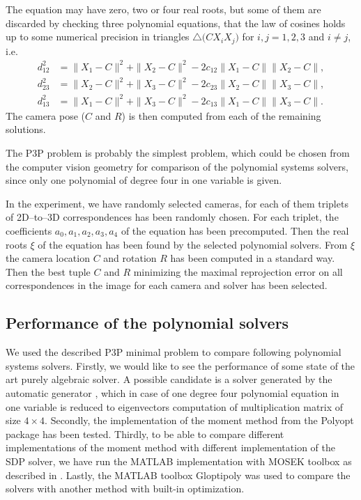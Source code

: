 The equation  may have zero, two or four real roots, but some of them are discarded by checking three polynomial equations, that the law of cosines holds up to some numerical precision in triangles $\triangle\big(CX_iX_j\big)$ for $i,j=1,2,3$ and $i\neq j$, i.e.
\begin{align}
  d_{12}^2 &= \|X_1-C\|^2 + \|X_2-C\|^2 - 2c_{12}\|X_1-C\|\|X_2-C\|,\\
  d_{23}^2 &= \|X_2-C\|^2 + \|X_3-C\|^2 - 2c_{23}\|X_2-C\|\|X_3-C\|,\\
  d_{13}^2 &= \|X_1-C\|^2 + \|X_3-C\|^2 - 2c_{13}\|X_1-C\|\|X_3-C\|.
\end{align}
The camera pose ($C$ and $R$) is then computed from each of the remaining solutions.

The P3P problem is probably the simplest problem, which could be chosen from the computer vision geometry for comparison of the polynomial systems solvers, since only one polynomial of degree four in one variable is given.


In the experiment, we have randomly selected \importAppPPPNumCameras{} cameras, for each of them \importAppPPPNumPoints{} triplets of 2D--to--3D correspondences has been randomly chosen.
For each triplet, the coefficients $a_0, a_1, a_2, a_3, a_4$ of the equation  has been precomputed.
Then the real roots $\xi$  of the equation  has been found by the selected polynomial solvers.
From $\xi$ the camera location $C$ and rotation $R$ has been computed in a standard way.
Then the best tuple $C$ and $R$ minimizing the maximal reprojection error on all correspondences in the image for each camera and solver has been selected.

\subsection{Performance of the polynomial solvers}
We used the described P3P minimal problem to compare following polynomial systems solvers.
Firstly, we would like to see the performance of some state of the art purely algebraic solver.
A possible candidate is a solver generated by the automatic generator \cite{autogen}, which in case of one degree four polynomial equation in one variable is reduced to eigenvectors computation of multiplication matrix of size $4\times4$.
Secondly, the implementation of the moment method from the Polyopt package has been tested.
Thirdly, to be able to compare different implementations of the moment method with different implementation of the SDP solver, we have run the MATLAB implementation with MOSEK toolbox as described in .
Lastly, the MATLAB toolbox Gloptipoly \cite{gloptipoly} was used to compare the solvers with another method with built-in optimization.

